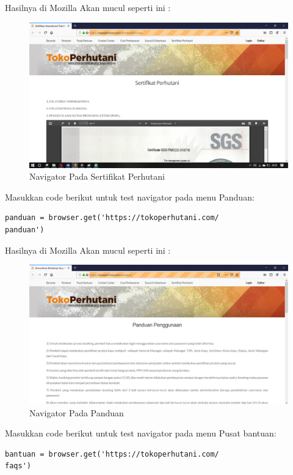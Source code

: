 Hasilnya  di Mozilla Akan mucul seperti ini :
\begin{figure}[h]
	\centering
	\includegraphics[scale=0.25]{figures/3}
	\caption{Navigator Pada Sertifikat Perhutani}
\end{figure}

Masukkan code berikut untuk test navigator pada menu  Panduan:
\begin{verbatim}
panduan = browser.get('https://tokoperhutani.com/
panduan')
\end{verbatim}

Hasilnya  di Mozilla Akan mucul seperti ini :
\begin{figure}[h]
	\centering
	\includegraphics[scale=0.28]{figures/1hasil.PNG}
	\caption{Navigator Pada Panduan}
\end{figure}

Masukkan code berikut untuk test navigator pada menu  Pusat bantuan:
\begin{verbatim}
bantuan = browser.get('https://tokoperhutani.com/
faqs')
\end{verbatim}

